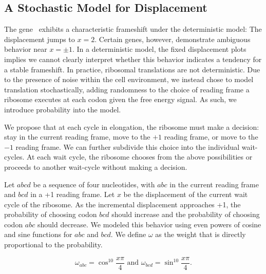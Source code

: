 \documentclass[12pt, draft]{article}
\numberwithin{equation}{section}
\begin{document}
\subsection{A Stochastic Model for Displacement}


The gene \prfB\ exhibits a characteristic frameshift under the deterministic model: The displacement jumps to $x=2$.
Certain genes, however, demonstrate ambiguous behavior near $x = \pm 1$.
In a deterministic model, the fixed displacement plots implies
we cannot clearly interpret whether this behavior indicates a tendency for a stable frameshift.
In practice, ribosomal translations are not deterministic. Due to the presence of
noise within the cell environment, we instead chose to model translation stochastically, adding
randomness to the choice of reading frame a ribosome executes at each codon given the free energy signal.
As such, we introduce probability into the model.

We propose that at each cycle in elongation, the ribosome must make a decision: stay in the current reading frame,
move to the $+1$ reading frame,
or move to the $-1$ reading frame.  We can further subdivide this choice into the individual wait-cycles.
At each wait cycle, the ribosome chooses from the above possibilities or proceeds to another wait-cycle without making a decision.

Let $abcd$ be a sequence of four nucleotides, with $abc$ in the
current reading frame and $bcd$ in a +1 reading frame.  Let $x$ be the
displacement of the current wait cycle of the ribosome.  As the
incremental displacement approaches +1, the probability of choosing
codon $bcd$ should increase and the probability of choosing codon
$abc$ should decrease.  We modeled this behavior using even powers of
cosine and sine functions for $abc$ and $bcd$.  We
define $\omega$ as the weight that is directly proportional to
the probability.

\begin{equation}
  \omega_{abc} = \cos^{10}{\frac{x\pi}{4}} \text{ and } \omega_{bcd} = \sin^{10}{\frac{x\pi}{4}}.
\end{equation}
\end{document}
